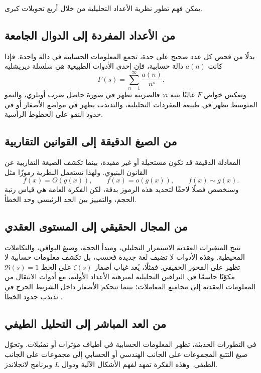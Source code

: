 يمكن فهم تطور نظرية الأعداد التحليلية من خلال أربع تحويلات كبرى.

\subsection{من الأعداد المفردة إلى الدوال الجامعة}

بدلًا من فحص كل عدد صحيح على حدة، تجمع المعلومات الحسابية في دالة واحدة. فإذا كانت
\(a(n)\) دالة حسابية، فإن إحدى الأدوات الطبيعية هي سلسلة ديريشليه
\[
F(s)=\sum_{n=1}^{\infty}\frac{a(n)}{n^s}.
\]
وتعكس خواص \(F\) غالبًا بنية \(a\): فالضربية تظهر في صورة حاصل ضرب أويلري، والنمو المتوسط يظهر في طبيعة المفردات التحليلية، والتذبذب يظهر في مواضع الأصفار أو في حدود النمو على الخطوط الرأسية.

\subsection{من الصيغ الدقيقة إلى القوانين التقاربية}

المعادلة الدقيقة قد تكون مستحيلة أو غير مفيدة، بينما تكشف الصيغة التقاربية عن القانون البنيوي. ولهذا تستعمل النظرية رموزًا مثل
\[
f(x)=O(g(x)),\qquad f(x)=o(g(x)),\qquad f(x)\sim g(x).
\]
وسنخصص فصلًا لاحقًا لتحديد هذه الرموز بدقة، لكن الفكرة العامة هي قياس رتبة الحجم، والتمييز بين الحد الرئيسي وحد الخطأ.

\subsection{من المجال الحقيقي إلى المستوى العقدي}

تتيح المتغيرات العقدية الاستمرار التحليلي، ومبدأ الحجة، وصيغ البواقي، والتكاملات المحيطية. وهذه الأدوات لا تضيف لغة جديدة فحسب، بل تكشف معلومات حسابية لا تظهر على المحور الحقيقي. فمثلًا، يُعد غياب أصفار \(\zeta(s)\) على الخط \(\Re(s)=1\) مكوّنًا
حاسمًا في البراهين التحليلية لمبرهنة الأعداد الأولية، مع أدوات الانتقال
من المعلومات العقدية إلى مجاميع المعاملات؛ بينما تتحكم الأصفار داخل
الشريط الحرج في تذبذب حدود الخطأ \cite{Davenport2000,Titchmarsh1986}.

\subsection{من العد المباشر إلى التحليل الطيفي}

في التطورات الحديثة، تظهر المعلومات الحسابية في أطياف مؤثرات أو تمثيلات. وتحوّل صيغ التتبع المجموعات على الجانب الهندسي أو الحسابي إلى مجموعات على الجانب الطيفي. وهذه الفكرة تمهد لفهم الأشكال الآلية ودوال \(L\) وبرنامج لانجلاندز.

